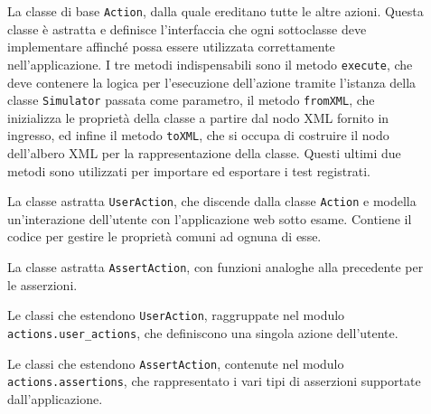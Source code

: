 \documentclass[12pt]{toptesi}
\begin{document}
\begin{description}
\item[ ] La classe di base \verb|Action|, dalla quale ereditano tutte le altre azioni. Questa classe è astratta e definisce l'interfaccia che ogni sottoclasse deve implementare affinché possa essere utilizzata correttamente nell'applicazione.
I tre metodi indispensabili sono il metodo \verb|execute|, che deve contenere la logica per l'esecuzione dell'azione tramite l'istanza della classe \verb|Simulator| passata come parametro, il metodo \verb|fromXML|, che inizializza le proprietà della classe a partire dal nodo XML fornito in ingresso, ed infine il metodo \verb|toXML|, che si occupa di costruire il nodo dell'albero XML per la rappresentazione della classe. Questi ultimi due metodi sono utilizzati per importare ed esportare i test registrati.

\item[ ] La classe astratta \verb|UserAction|, che discende dalla classe \verb|Action| e modella un'interazione dell'utente con l'applicazione web sotto esame. Contiene il codice per gestire le proprietà comuni ad ognuna di esse.

\item[ ] La classe astratta \verb|AssertAction|, con funzioni analoghe alla precedente per le asserzioni.

\item[ ] Le classi che estendono \verb|UserAction|, raggruppate nel modulo \verb|actions.user_actions|, che definiscono una singola azione dell'utente.

\item[ ] Le classi che estendono \verb|AssertAction|, contenute nel modulo \verb|actions.assertions|, che rappresentato i vari tipi di asserzioni supportate dall'applicazione.
 
\end{description}
\end{document}

